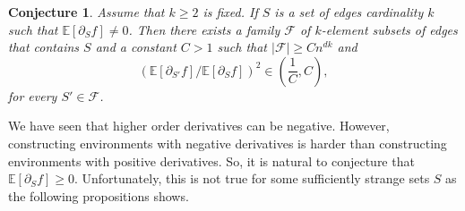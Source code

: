 \documentclass[reqno]{amsart}
\newtheorem{conjecture}{Conjecture}
\begin{document}
 \begin{conjecture}\label{conj|Equivalence} Assume that $k\geq 2$ is fixed. If $S$ is a set of edges cardinality $k$ such that $\mathbb E[\partial_Sf]\neq 0$. Then there exists a family $\mathcal F$ of $k$-element subsets of edges that contains $S$ and a constant $C>1$ such that $|\mathcal F|\geq Cn^{dk}$ and 
\[\left(\mathbb E\left[\partial_{S'}f\right]/\mathbb E\left[\partial_Sf\right]\right)^2\in\left(\frac1C,C\right),\] for every $S'\in \mathcal  F$.
\end{conjecture}
We have seen that higher order derivatives can be negative. However, constructing environments with negative derivatives is harder than constructing environments with positive derivatives. So, it is natural to conjecture that $\mathbb E[\partial_Sf]\geq 0$. Unfortunately, this is not true for some sufficiently strange sets $S$ as the following propositions shows.
\end{document}
